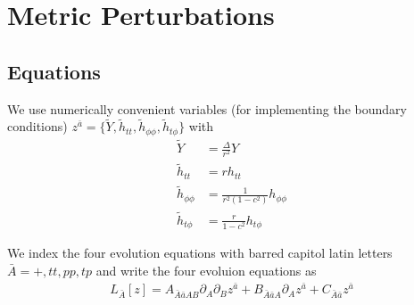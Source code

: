 \documentclass[aps,prd,amsmath,showpacs,amssymb,superscriptaddress,nofootinbib,longbibliography,eqsecnum,preprintnumbers]{revtex4-1}
\begin{document}

\section{Metric Perturbations}
\subsection{Equations}
We use numerically convenient variables (for implementing the boundary conditions) $z^{\bar a}=\{\tilde Y, \tilde h_{tt}, \tilde h_{\phi\phi}, \tilde h_{t\phi} \}$ with
\begin{align}
\tilde Y&=\frac{\Delta}{r^2}Y \nonumber \\
\tilde h_{tt}&=r h_{tt} \nonumber \\
\tilde h_{\phi\phi}&=\frac{1}{r^2(1-c^2)}h_{\phi\phi}
\nonumber \\
\tilde h_{t \phi}&=\frac{r}{1-c^2}h_{t\phi}
\end{align}

We index the four evolution equations with barred capitol latin letters$\bar A={+,tt,pp,tp}$ and write the four evoluion equations as
\begin{align}
L_{\bar A}[z]=A_{\bar A \bar a AB}\partial_{A}\partial_{B}z^{\bar a}+B_{\bar A \bar a A}\partial_{A}z^{\bar a}
+C_{\bar A \bar a }z^{\bar a}
\end{align}
\end{document}
